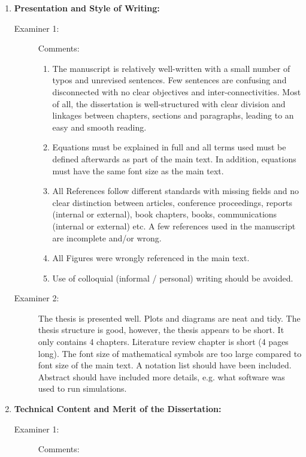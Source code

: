\documentclass[14pt,twoside]{report}
\begin{document}
\begin{enumerate}
%
    \item {\bf Presentation and Style of Writing:}
        \begin{description}
            \item[Examiner 1:] Comments:
                   \begin{enumerate}
                      \item The manuscript is relatively well-written with a small number of typos and unrevised sentences. Few sentences are confusing and disconnected with no clear objectives and inter-connectivities. Most of all, the dissertation is well-structured with clear division and linkages between chapters, sections and paragraphs, leading to an easy and smooth reading.
                      \item Equations must be explained in full and all terms used must be defined afterwards as part of the main text. In addition, equations must have the same font size as the main text.
                      \item All References follow different standards with missing fields and no clear distinction between articles, conference proceedings, reports (internal or external), book chapters, books, communications (internal or external) etc.  A few references used in the manuscript are incomplete and/or wrong.
                      \item All Figures were wrongly referenced in the main text.
                      \item Use of colloquial (informal / personal) writing should be avoided.	
                    \end{enumerate}
            \item[Examiner 2:] The thesis is presented well. Plots and diagrams are neat and tidy. The thesis structure is good, however, the thesis appears to be short. It only contains 4 chapters. Literature review chapter is short (4 pages long). The font size of mathematical symbols are too large compared to font size of the main text. A notation list should have been included. Abstract should have included more details, e.g. what software was used to run simulations. 
        \end{description}
%
    \item {\bf Technical Content and Merit of the Dissertation:}
        \begin{description}
            \item[Examiner 1:] Comments:
                 \begin{enumerate}

\end{enumerate}
\end{description}
\end{enumerate}
\end{document}
